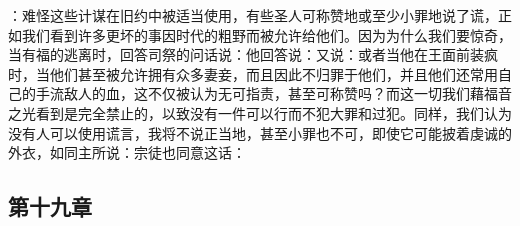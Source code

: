 ：难怪这些计谋在旧约中被适当使用，有些圣人可称赞地或至少小罪地说了谎，正如我们看到许多更坏的事因时代的粗野而被允许给他们。因为为什么我们要惊奇，当有福的逃离时，回答司祭的问话说：他回答说：又说：或者当他在王面前装疯时，当他们甚至被允许拥有众多妻妾，而且因此不归罪于他们，并且他们还常用自己的手流敌人的血，这不仅被认为无可指责，甚至可称赞吗？而这一切我们藉福音之光看到是完全禁止的，以致没有一件可以行而不犯大罪和过犯。同样，我们认为没有人可以使用谎言，我将不说正当地，甚至小罪也不可，即使它可能披着虔诚的外衣，如同主所说：宗徒也同意这话：\par


\subsection{第十九章}

\par

